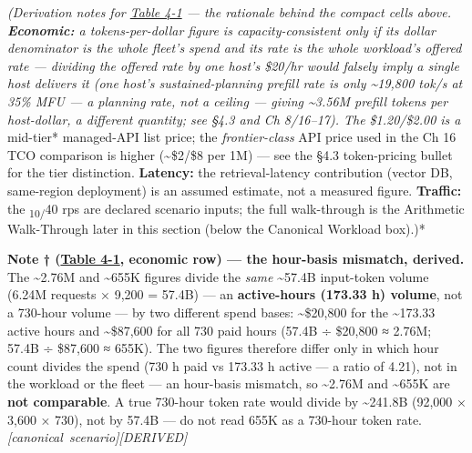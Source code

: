 \emph{(Derivation notes for \hyperref[tab:4.1]{Table 4-1} --- the rationale behind the
compact cells above. \textbf{Economic:} a tokens-per-dollar figure is
capacity-consistent only if its dollar denominator is the whole fleet's
spend and its rate is the whole workload's offered rate --- dividing the
offered rate by one host's \$20/hr would falsely imply a single host
delivers it (one host's sustained-planning prefill rate is only
\textasciitilde19,800 tok/s at 35\% MFU --- a planning rate, not a
ceiling --- giving \textasciitilde3.56M prefill tokens per host-dollar,
a different quantity; see §4.3 and Ch 8/16--17). The \$1.20/\$2.00 is a
}mid-tier* managed-API list price; the \emph{frontier-class} API price
used in the Ch 16 TCO comparison is higher (\textasciitilde\$2/\$8 per
1M) --- see the §4.3 token-pricing bullet for the tier distinction.
\textbf{Latency:} the retrieval-latency contribution (vector DB,
same-region deployment) is an assumed estimate, not a measured figure.
\textbf{Traffic:} the \textsubscript{10/}40 rps are declared scenario
inputs; the full walk-through is the Arithmetic Walk-Through later in
this section (below the Canonical Workload box).)*

\textbf{Note † (\hyperref[tab:4.1]{Table 4-1}, economic row) --- the hour-basis mismatch,
derived.} The \textasciitilde2.76M and \textasciitilde655K figures
divide the \emph{same} \textasciitilde57.4B input-token volume (6.24M
requests × 9,200 = 57.4B) --- an \textbf{active-hours (173.33 h)
volume}, not a 730-hour volume --- by two different spend bases:
\textasciitilde\$20,800 for the \textasciitilde173.33 active hours and
\textasciitilde\$87,600 for all 730 paid hours (57.4B ÷ \$20,800 ≈
2.76M; 57.4B ÷ \$87,600 ≈ 655K). The two figures therefore differ only
in which hour count divides the spend (730 h paid vs 173.33 h active ---
a ratio of 4.21), not in the workload or the fleet --- an hour-basis
mismatch, so \textasciitilde2.76M and \textasciitilde655K are
\textbf{not comparable}. A true 730-hour token rate would divide by
\textasciitilde241.8B (92,000 × 3,600 × 730), not by 57.4B --- do not
read 655K as a 730-hour token rate. \emph{\mbox{{[}canonical
scenario{]}}\hspace{0pt}\mbox{{[}DERIVED{]}}}

